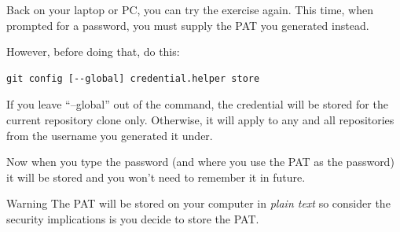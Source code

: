 Back on your laptop or PC, you can try the  exercise again. This time, when prompted for a password, you must supply the PAT you generated instead.

However, before doing that, do this:

\begin{lstlisting}
git config [--global] credential.helper store
\end{lstlisting}

If you leave ``--global'' out of the command, the credential will be stored for the current repository clone only. Otherwise, it will apply to any and all repositories from the username you generated it under.

Now when you type the password (and where you use the PAT as the password) it will be stored and you won't need to remember it in future.

\begin{tips}{Warning}
    The PAT will be stored on your computer in \emph{plain text} so consider the security implications is you decide to store the PAT.
\end{tips}

